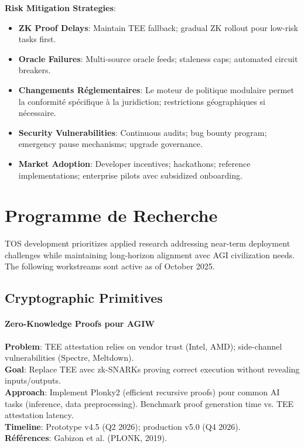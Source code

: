 \documentclass[11pt]{article}
\begin{document}
\textbf{Risk Mitigation Strategies}:
\begin{itemize}[noitemsep]
  \item \textbf{ZK Proof Delays}: Maintain TEE fallback; gradual ZK rollout pour low-risk tasks first.
  \item \textbf{Oracle Failures}: Multi-source oracle feeds; staleness caps; automated circuit breakers.
  \item \textbf{Changements Réglementaires}: Le moteur de politique modulaire permet la conformité spécifique à la juridiction; restrictions géographiques si nécessaire.
  \item \textbf{Security Vulnerabilities}: Continuous audits; bug bounty program; emergency pause mechanisms; upgrade governance.
  \item \textbf{Market Adoption}: Developer incentives; hackathons; reference implementations; enterprise pilots avec subsidized onboarding.
\end{itemize}

\section{Programme de Recherche}
\label{sec:research}

TOS development prioritizes applied research addressing near-term deployment challenges while maintaining long-horizon alignment avec AGI civilization needs. The following workstreams sont active as of October 2025.

\subsection{Cryptographic Primitives}

\paragraph{Zero-Knowledge Proofs pour AGIW}
\textbf{Problem}: TEE attestation relies on vendor trust (Intel, AMD); side-channel vulnerabilities (Spectre, Meltdown).\\
\textbf{Goal}: Replace TEE avec zk-SNARKs proving correct execution without revealing inputs/outputs.\\
\textbf{Approach}: Implement Plonky2 (efficient recursive proofs) pour common AI tasks (inference, data preprocessing). Benchmark proof generation time vs. TEE attestation latency.\\
\textbf{Timeline}: Prototype v4.5 (Q2 2026); production v5.0 (Q4 2026).\\
\textbf{Références}: Gabizon et al. (PLONK, 2019).
\end{document}
